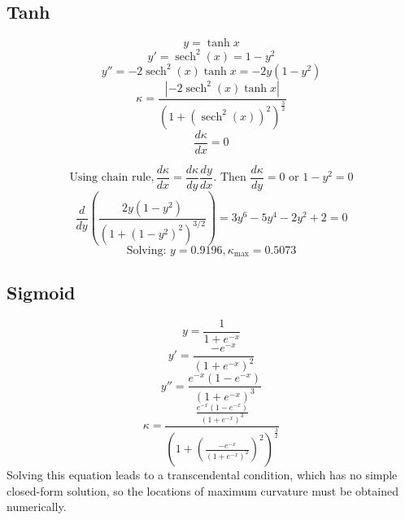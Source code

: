\documentclass{article}
\begin{document}
\subsection{Tanh}\label{app:tanh}

\begin{displaymath}
  y = \tanh{x}
\end{displaymath}
\begin{displaymath}
y' = \operatorname{sech}^2(x) = 1 - y^2
\end{displaymath}
\begin{displaymath}
y'' = -2\operatorname{sech}^2(x)\tanh{x} = -2y(1 - y^2)
\end{displaymath}
\begin{displaymath}
\kappa = \frac{|-2\operatorname{sech}^2(x)\tanh{x}|}{(1 + (\operatorname{sech}^2(x))^2)^\frac{3}{2}}
\end{displaymath}
\begin{displaymath}
\frac{d \kappa}{dx} = 0 
\end{displaymath}

\begin{displaymath}
\text{Using chain rule}, \frac{d \kappa}{dx} = \frac{d \kappa}{dy}\frac{dy}{dx}\text{. Then } \frac{d \kappa}{dy} = 0 \text{ or } 1 - y^2 = 0
\end{displaymath}
\begin{displaymath}
  \frac{d}{dy}\left( \frac{2y(1 - y^2)}{(1 + (1 - y^2)^2)^{3/2}}\right) = 3y^6 - 5y^4 - 2y^2 + 2 = 0
\end{displaymath}
\begin{displaymath}
  \text{Solving: }y = 0.9196, \kappa_{\max} = 0.5073
\end{displaymath}

\subsection{Sigmoid}\label{app:sigmoid}

\begin{displaymath}
  y = \frac{1}{1 + e^{-x}}
\end{displaymath}
\begin{displaymath}
  y' = \frac{-e^{-x}}{(1 + e^{-x})^2}
\end{displaymath}
\begin{displaymath}
  y'' = \frac{e^{-x}(1 - e^{-x})}{(1 + e^{-x})^3}
\end{displaymath}
\begin{displaymath}
  \kappa = \frac{\frac{e^{-x}(1 - e^{-x})}{(1 + e^{-x})^3}}{(1 + ( \frac{-e^{-x}}{(1 + e^{-x})^2})^2)^\frac{3}{2}}
\end{displaymath}
Solving this equation leads to a transcendental condition, 
which has no simple closed-form solution, so the 
locations of maximum curvature must be obtained numerically.
\end{document}
